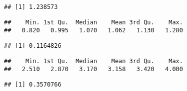 \documentclass[
]{article}
\newenvironment{Shaded}{\begin{snugshade}}{\end{snugshade}}
\newcommand{\DataTypeTok}[1]{\textcolor[rgb]{0.13,0.29,0.53}{#1}}
\newcommand{\KeywordTok}[1]{\textcolor[rgb]{0.13,0.29,0.53}{\textbf{#1}}}
\newcommand{\NormalTok}[1]{#1}
\newcommand{\OperatorTok}[1]{\textcolor[rgb]{0.81,0.36,0.00}{\textbf{#1}}}
\newcommand{\StringTok}[1]{\textcolor[rgb]{0.31,0.60,0.02}{#1}}
\begin{document}
\begin{verbatim}
## [1] 1.238573
\end{verbatim}

\begin{Shaded}
\end{Shaded}

\begin{verbatim}
##    Min. 1st Qu.  Median    Mean 3rd Qu.    Max. 
##   0.820   0.995   1.070   1.062   1.130   1.280
\end{verbatim}

\begin{Shaded}
\end{Shaded}

\begin{verbatim}
## [1] 0.1164826
\end{verbatim}

\begin{Shaded}
\end{Shaded}

\begin{verbatim}
##    Min. 1st Qu.  Median    Mean 3rd Qu.    Max. 
##   2.510   2.870   3.170   3.158   3.420   4.000
\end{verbatim}

\begin{Shaded}
\end{Shaded}

\begin{verbatim}
## [1] 0.3570766
\end{verbatim}

\begin{Shaded}
\end{Shaded}
\end{document}
